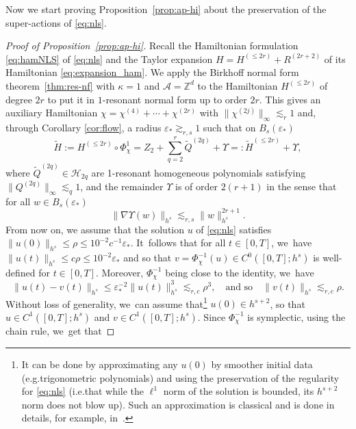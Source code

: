 \documentclass[10pt,a4paper]{amsart}
\providecommand{\ie}{i.e.}
\providecommand{\eg}{e.g.}
\theoremstyle{plain}
\theoremstyle{definition}
\newcommand{\1}{\mathbf{1}}
\begin{document}
Now we start proving Proposition~\ref{prop:ap-hi} about the preservation of the super-actions of \eqref{eq:nls}.

\begin{proof}[Proof of Proposition~\ref{prop:ap-hi}]
Recall the Hamiltonian formulation \eqref{eq:hamNLS} of \eqref{eq:nls} and the Taylor expansion $H = H^{(\leq 2r)} + R^{(2r+2)}$ of its Hamiltonian \eqref{eq:expansion_ham}. We apply the Birkhoff normal form theorem~\ref{thm:res-nf} with $\kappa=1$ and $\mathcal{A}= \mathbb{Z}^d$ to the Hamiltonian $H^{(\leq 2r)}$ of degree $2r$ to put it in $1$-resonant normal form up to order $2r$. This gives an auxiliary Hamiltonian $\chi = \chi^{(4)} + \cdots + \chi^{(2r)}$ with $\| \chi^{(2j)}\|_\infty \lesssim_r 1$ and, through Corollary \ref{cor:flow}, a radius $\varepsilon_\ast \gtrsim_{r,s} 1$ such that on $B_s(\varepsilon_*)$
\[
\widetilde{H}:=H^{(\leq 2r)}\circ\Phi_\chi^1 =Z_2+ \sum_{q=2}^{r}\widetilde{Q}^{(2q)}+\Upsilon =: \widetilde{H}^{(\leq 2r)} + \Upsilon,
\]
where $\widetilde{Q}^{(2q)} \in \mathcal{H}_{2q}$ are 1-resonant homogeneous polynomials satisfying $\| Q^{(2q)}\|_{\infty} \lesssim_q 1 $, and
the remainder $\Upsilon$ is of order $2(r+1)$ in the sense that for all $w\in B_s(\varepsilon_*)$
\begin{equation}
\label{eq:bientotnoel}
\|\nabla \Upsilon(w)\|_{h^{s}}\lesssim_{r,s} \| w\|_{h^s}^{2r+1}.
\end{equation}
From now on, we assume that the solution $u$ of \eqref{eq:nls} satisfies \hbox{$\| u(0) \|_{h^s} \!\!\leq\! \rho \!\leq\! 10^{-2}\! c^{-1}\!\varepsilon_\ast$}. It~follows that for all $t\in [0,T]$, we~have $\|u(t) \|_{h^s} \leq c \rho\leq 10^{-2} \varepsilon_\ast$ and so that $v = \Phi_\chi^{-1}(u) \in C^0([0,T];h^s)$ is well-defined for $t\in [0,T]$. Moreover, $ \Phi_\chi^{-1}$ being close to the identity, we~have
\begin{equation}
\label{eq:pr-var}
\|u(t)-v(t)\|_{h^{s}}\leq \varepsilon_{\ast}^{-2}\|u(t)\|_{h^{s}}^{3} \lesssim_{r,c} \rho^3,\quad \text{and \ so}\quad \|v(t)\|_{h^{s}}\lesssim_{r,c} \rho.
\end{equation}
Without loss of generality, we~can assume that\footnote{It can be done by approximating any $u(0)$ by smoother initial data (\eg trigonometric polynomials) and using the preservation of the regularity for \eqref{eq:nls} (\ie that while the $\ell^1$ norm of the solution is bounded, its $h^{s+2}$ norm does not blow up). Such an approximation is classical and is done in details, for example, in~\cite{BG22}.} $u(0) \in h^{s+2}$, so that $u\in C^1([0,T];h^s)$ and $v \in C^1([0,T];h^s)$. Since $\Phi_\chi^{-1}$ is symplectic, using the chain rule, we~get that

\end{proof}
\end{document}
